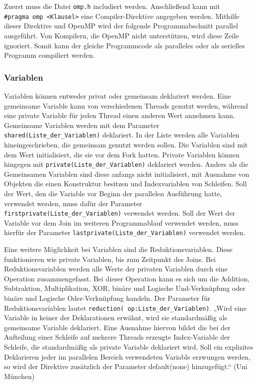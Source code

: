 \documentclass[../main.tex]{subfiles}
\begin{document}
Zuerst muss die Datei \texttt{omp.h} includiert werden. Anschließend kann mit \texttt{\#pragma\ omp\ <Klausel>} eine Compiler-Direktive angegeben werden. Mithilfe dieser Direktive und OpenMP wird der folgende Programmabschnitt parallel ausgeführt. Von Kompilern, die OpenMP nicht unterstützen, wird diese Zeile ignoriert. Somit kann der gleiche Programmcode als paralleles oder als serielles Programm compiliert werden.

\subsubsection{Variablen}

Variablen können entweder privat oder gemeinsam deklariert werden. Eine gemeinsame Variable kann von verschiedenen Threads genutzt werden, während eine private Variable für jeden Thread einen anderen Wert annehmen kann. Gemeinsame Variablen werden mit dem Parameter \texttt{shared(Liste\_der\_Variablen)} deklariert. In der Liste werden alle Variablen hineingeschrieben, die gemeinsam genutzt werden sollen. Die Variablen sind mit dem Wert initialisiert, die sie vor dem Fork hatten. Private Variablen können hingegen mit \texttt{private(Liste\_der\_Variablen)} deklariert werden.  Anders als die Gemeinsamen Variablen sind diese anfangs nicht initialisiert, mit Ausnahme von Objekten die einen Konstruktur besitzen und Indexvariablen von Schleifen.
Soll der Wert, den die Variable vor Beginn der parallelen Ausführung hatte, verwendet werden, muss dafür der Parameter \texttt{firstprivate(Liste\_der\_Variablen)} verwendet werden. Soll der Wert der Variable vor dem Join im weiteren Programmablauf verwendet werden, muss hierfür der Parameter \texttt{lastprivate(Liste\_der\_Variablen)} verwendet werden.

Eine weitere Möglichkeit bei Variablen sind die Reduktionsvariablen. Diese funktionieren wie private Variablen, bis zum Zeitpunkt des Joins. Bei Reduktionsvariablen werden alle Werte der privaten Variablen durch eine Operation zusammengefasst. Bei dieser Operation kann es sich um die Addition, Subtraktion, Multiplikation, XOR, binäre und Logische Und-Verknüpfung oder binäre und Logische Oder-Verknüpfung handeln. Der Parameter für Reduktionsvariablen lautet \texttt{reduction( op:Liste\_der\_Variablen)}.
„Wird eine Variable in keiner der Deklarationen erwähnt, wird sie standardmäßig als gemeinsame Variable deklariert. Eine Ausnahme hiervon bildet die bei der Aufteilung einer Schleife auf mehrere Threads erzeugte Index-Variable der Schleife, die standardmäßig als private Variable deklariert wird. Soll ein explizites Deklarieren jeder im parallelen Bereich verwendeten Variable erzwungen werden, so wird der Direktive zusätzlich der Parameter default(none) hinzugefügt.“ (Uni München)
\end{document}
